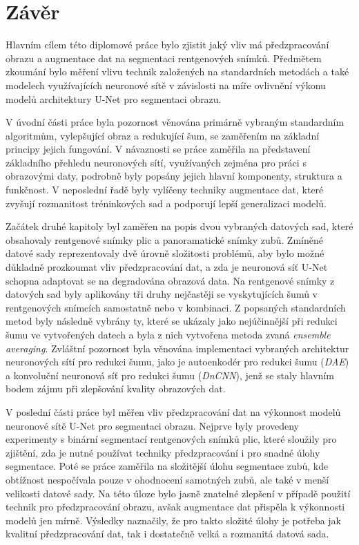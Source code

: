 \documentclass[male,czech,api_ing]{thesis}
\begin{document}
\chapter{Závěr}
Hlavním cílem této diplomové práce bylo zjistit jaký vliv má předzpracování obrazu a augmentace dat na segmentaci rentgenových snímků. Předmětem zkoumání bylo měření vlivu technik založených na standardních metodách a také modelech využívajících neuronové sítě v závislosti na míře ovlivnění výkonu modelů architektury U-Net pro segmentaci obrazu.

V úvodní části práce byla pozornost věnována primárně vybraným standardním algoritmům, vylepšující obraz a redukující šum, se zaměřením na základní principy jejich fungování. V návaznosti se práce zaměřila na představení základního přehledu neuronových sítí, využívaných zejména pro práci s obrazovými daty, podrobně byly popsány jejich hlavní komponenty, struktura a funkčnost. V neposlední řadě byly vylíčeny techniky augmentace dat, které zvyšují rozmanitost tréninkových sad a podporují lepší generalizaci modelů.

Začátek druhé kapitoly byl zaměřen na popis dvou vybraných datových sad, které obsahovaly rentgenové snímky plic a panoramatické snímky zubů. Zmíněné datové sady reprezentovaly dvě úrovně složitosti problémů, aby bylo možné důkladně prozkoumat vliv předzpracování dat, a zda je neuronová síť U-Net schopna adaptovat se na degradována obrazová data. Na rentgenové snímky z datových sad byly aplikovány tři druhy nejčastěji se vyskytujících šumů v rentgenových snímcích samostatně nebo v kombinaci. Z popsaných standardních metod byly následně vybrány ty, které se ukázaly jako nejúčinnější při redukci šumu ve vytvořených datech a byla z nich vytvořena metoda zvaná \textit{ensemble averaging}. Zvláštní pozornost byla věnována implementaci vybraných architektur neuronových sítí pro redukci šumu, jako je autoenkodér pro redukci šumu (\textit{DAE}) a konvoluční neuronová síť pro redukci šumu (\textit{DnCNN}), jenž se staly hlavním bodem zájmu při zlepšování kvality obrazových dat.

V poslední části práce byl měřen vliv předzpracování dat na výkonnost modelů neuronové sítě U-Net pro segmentaci obrazu. Nejprve byly provedeny experimenty s binární segmentací rentgenových snímků plic, které sloužily pro zjištění, zda je nutné používat techniky předzpracování i pro snadné úlohy segmentace. Poté se práce zaměřila na složitější úlohu segmentace zubů, kde obtížnost nespočívala pouze v ohodnocení samotných zubů, ale také v menší velikosti datové sady. Na této úloze bylo jasně znatelné zlepšení v případě použití technik pro předzpracování obrazu, avšak augmentace dat přispěla k výkonnosti modelů jen mírně. Výsledky naznačily, že pro takto složité úlohy je potřeba jak kvalitní předzpracování dat, tak i dostatečně velká a rozmanitá datová sada.
\end{document}
